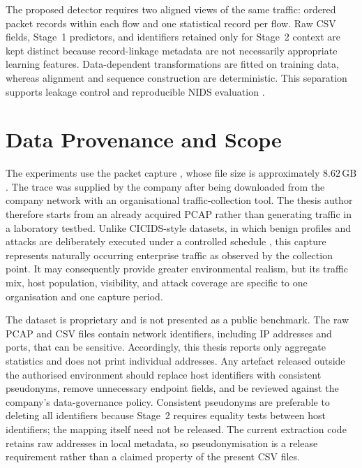 \documentclass[11pt,fleqn]{report}
\begin{document}
The proposed detector requires two aligned views of the same traffic: ordered packet records within each flow and one statistical record per flow. Raw CSV fields, Stage~1 predictors, and identifiers retained only for Stage~2 context are kept distinct because record-linkage metadata are not necessarily appropriate learning features. Data-dependent transformations are fitted on training data, whereas alignment and sequence construction are deterministic. This separation supports leakage control and reproducible NIDS evaluation \cite{Shiravi2012DatasetGeneration,Ring2019Datasets,Goldschmidt2025Datasets,Pinto2025DatasetReview}.

\section{Data Provenance and Scope}
\label{subsec:data_provenance}

The experiments use the packet capture , whose file size is approximately $8.62\,\mathrm{GB}$. The trace was supplied by the company after being downloaded from the company network with an organisational traffic-collection tool. The thesis author therefore starts from an already acquired PCAP rather than generating traffic in a laboratory testbed. Unlike CICIDS-style datasets, in which benign profiles and attacks are deliberately executed under a controlled schedule \cite{Sharafaldin2018CICIDS}, this capture represents naturally occurring enterprise traffic as observed by the collection point. It may consequently provide greater environmental realism, but its traffic mix, host population, visibility, and attack coverage are specific to one organisation and one capture period.

The dataset is proprietary and is not presented as a public benchmark. The raw PCAP and CSV files contain network identifiers, including IP addresses and ports, that can be sensitive. Accordingly, this thesis reports only aggregate statistics and does not print individual addresses. Any artefact released outside the authorised environment should replace host identifiers with consistent pseudonyms, remove unnecessary endpoint fields, and be reviewed against the company's data-governance policy. Consistent pseudonyms are preferable to deleting all identifiers because Stage~2 requires equality tests between host identifiers; the mapping itself need not be released. The current extraction code retains raw addresses in local metadata, so pseudonymisation is a release requirement rather than a claimed property of the present CSV files.
\end{document}
